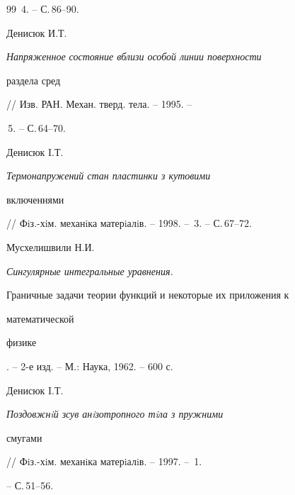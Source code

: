 \begin{thebibliography}{99}
\No\,4. -- С.\,86--90. 




Денисюк И.Т. {\em Напряженное состояние вблизи особой линии поверхности 


раздела сред} // Изв. РАН. Механ. тверд. тела. -- 1995. -- 


\No\,5. -- С.\,64--70. 




Денисюк I.Т. {\em Термонапружений стан пластинки з кутовими 


включеннями} 


// Фiз.-хiм. механiка матерiалiв. -- 1998. -- \No\,3. -- С.\,67--72. 




Мусхелишвили Н.И. {\em Сингулярные интегральные уравнения. 


Граничные задачи теории функций и некоторые их приложения к 


математической 


физике}. -- 2-е изд. -- М.: Наука, 1962. -- 600 с. 




Денисюк I.Т. {\em Поздовжнiй зсув анiзотропного тiла з пружними 


смугами} // Фiз.-хiм. механiка матерiалiв. -- 1997. -- \No\,1. 


-- С.\,51--56. 


 


\end{thebibliography} 


 


\vskip 2cm 


 








\label{end} 


 


